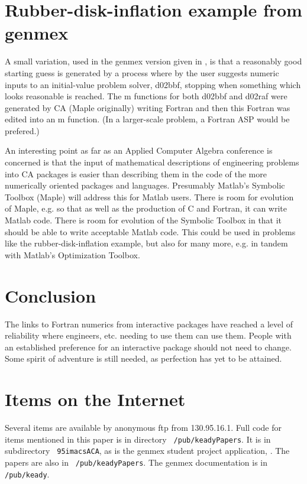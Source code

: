 \section*{Rubber-disk-inflation example from genmex}

A small variation, used in the genmex version
given in \cite{H}, is that a reasonably good starting guess
is generated by a process where by the user suggests
numeric inputs to an initial-value problem solver,
d02bbf, stopping when something which looks reasonable is
reached.
The m functions for both d02bbf and d02raf were generated by CA 
(Maple originally)
writing Fortran and then this Fortran was edited into an
m function.
(In a larger-scale problem, a Fortran ASP would be prefered.)

An interesting point as far as an Applied Computer Algebra
conference is concerned is that the input of mathematical
descriptions of engineering problems into CA packages is
easier than describing them in the code of the more numerically 
oriented packages and languages.
Presumably Matlab's Symbolic Toolbox (Maple) will address this
for Matlab users.
There is room for evolution of Maple, e.g. so that as well
as the production of C and Fortran, it can write Matlab
code.
There is room for evolution of the Symbolic Toolbox in that it
should be able to write acceptable Matlab code.
This could be used in problems like
the rubber-disk-inflation example,
but also for many more, e.g. in tandem with 
Matlab's Optimization Toolbox.

\section*{Conclusion}

The links to Fortran numerics from interactive packages
have reached a level of reliability where engineers, etc.
needing to use them can use them.
People with an established preference for an interactive
package should not need to change.
Some spirit of adventure is still needed, as
perfection has yet to be attained.


\section*{Items on the Internet}

Several items
are available by anonymous ftp from 130.95.16.1.
Full code for items mentioned in this paper is
in directory \verb$ /pub/keadyPapers$.
It is in subdirectory \verb$ 95imacsACA$,
as is the genmex student project application, \cite{H}.
The papers \cite{BKRRD,BK,K92,KN,KR} %
are also in \verb$ /pub/keadyPapers$.
The genmex documentation \cite{KL}
is in  \verb$ /pub/keady$.

